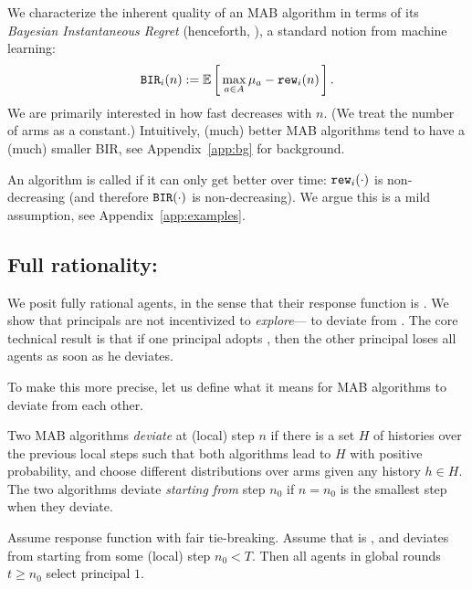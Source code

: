 We characterize the inherent quality of an MAB algorithm in terms of its \emph{Bayesian Instantaneous Regret} (henceforth, \BIR), a standard notion from machine learning:
\begin{align}\label{eq:theory-BIR-defn}
\BIR_i(n) := \E\sbr{ \max_{a\in A} \mu_a - \rew_i(n)}.
\end{align}
We are primarily interested in how fast \BIR decreases with $n$. (We treat the number of arms as a constant.) Intuitively, (much) better MAB algorithms tend to have a (much) smaller BIR, see Appendix~\ref{app:bg} for background.

An algorithm is called \emph{\bmonotone} if it can only get better over time: $\mathtt{rew}_i(\cdot)$ is non-decreasing (and therefore $\mathtt{BIR}(\cdot)$ is non-decreasing). We argue this is a mild assumption, see
Appendix~\ref{app:examples}.



\subsection{Full rationality: \HardMax}
\label{sec:theory-HM}

We posit fully rational agents, in the sense that their response function is \HardMax. We show that principals are not incentivized to \emph{explore}--- \ie to deviate from \DynGreedy. The core technical result is that if one principal adopts \DynGreedy, then the other principal loses all agents as soon as he deviates.

To make this more precise, let us define what it means for MAB algorithms to deviate from each other.

\begin{definition}
Two MAB algorithms \emph{deviate} at (local) step $n$ if there is a set $H$ of histories over the previous local steps such that both algorithms lead to $H$ with positive probability, and choose different distributions over arms given any history $h\in H$. The two algorithms deviate \emph{starting from} step $n_0$ if $n=n_0$ is the smallest step when they deviate.
\end{definition}

\begin{theorem}\label{thm:DG-dominance}
Assume \HardMax response function with fair tie-breaking. Assume that \alg[1] is \DynGreedy, and \alg[2] deviates from \DynGreedy starting from some (local) step $n_0<T$. Then all agents in global rounds $t\geq n_0$ select principal $1$.
\end{theorem}

